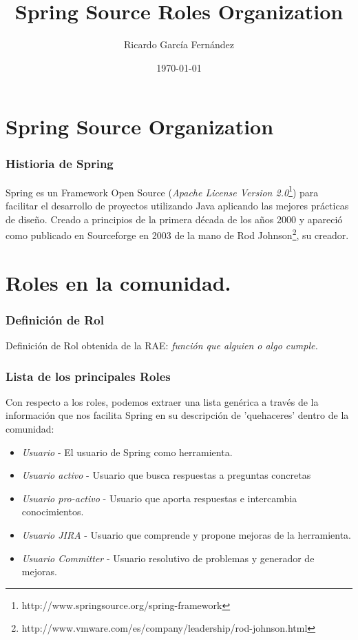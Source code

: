 \documentclass[xcolor=dvipsnames]{beamer}
\title{Spring Source Roles Organization}
\author{Ricardo Garc\'ia Fern\'andez}
\date{\today}
\begin{document}
\frame{\titlepage}

\section[\'Indice]{}
\begin{frame}[allowframebreaks]
\tableofcontents
\end{frame}

\section{Spring Source Organization}
\begin{frame}[allowframebreaks]
\frametitle{Histioria de Spring}
Spring es un Framework Open Source (\emph{Apache License Version 2.0}\footnote{http://www.springsource.org/spring-framework}) para facilitar el desarrollo de proyectos utilizando Java aplicando las mejores pr\'acticas de dise\~no. Creado a principios de la primera d\'ecada de los a\~nos 2000 y apareci\'o como publicado en Sourceforge en 2003 de la mano de Rod Johnson\footnote{http://www.vmware.com/es/company/leadership/rod-johnson.html}, su creador.
\end{frame}

\section{Roles en la comunidad.}
\begin{frame}[allowframebreaks]
\frametitle{Definici\'on de Rol}
Definici\'on de Rol obtenida de la RAE: \emph{funci\'on que alguien o algo cumple.}
\end{frame}

\begin{frame}[allowframebreaks]
\frametitle{Lista de los principales Roles}
Con respecto a los roles, podemos extraer una lista gen\'erica a trav\'es de la informaci\'on que nos facilita Spring en su descripci\'on de 'quehaceres' dentro de la comunidad:
\begin{itemize}
    \item \emph{Usuario} - El usuario de Spring como herramienta.
    \item \emph{Usuario activo} - Usuario que busca respuestas a preguntas concretas
    \item \emph{Usuario pro-activo} - Usuario que aporta respuestas e intercambia conocimientos.
    \item \emph{Usuario JIRA} - Usuario que comprende y propone mejoras de la herramienta.
    \item \emph{Usuario Committer} - Usuario resolutivo de problemas y generador de mejoras.
\end{itemize}
\end{frame}
\end{document}

